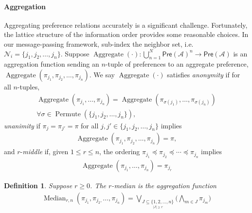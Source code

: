 \documentclass[conference]{ieeeconf}
\newcommand{\N}{\mathcal{N}}
\newcommand{\A}{\mathcal{A}}
\newcommand{\Pref}{\mathsf{Pre}}
\newcommand{\bigjoin}{\bigvee}
\newcommand{\bigmeet}{\bigwedge}
\renewcommand{\leq}{\leqslant}
\renewcommand{\geq}{\geqslant}
\DeclareMathOperator{\Aggregate}{Aggregate}
\DeclareMathOperator{\Median}{Median}
\DeclareMathOperator{\Permute}{Permute}
\newtheorem{definition}{Definition}
\begin{document}
\paragraph*{Aggregation}
Aggregating preference relations accurately is a significant challenge. Fortunately, the lattice structure of the information order provides some reasonable choices. In our message-passing framework, sub-index the neighbor set, i.e. $\N_i = \{j_1,j_2,\dots,j_n\}$. Suppose $\Aggregate(\cdot): \bigcup_{n =1}^{N} \Pref(\A)^n \to \Pref(\A)$ is an aggregation function sending an $n$-tuple of preferences to an aggregate preference, $\Aggregate(\pi_{j_1},\pi_{j_2}, \dots, \pi_{j_n})$. We say $\Aggregate(\cdot)$ satisfies \emph{anonymity} if for all $n$-tuples,
\begin{align*}
    \Aggregate\left( \pi_{j_1},\dots,\pi_{j_n}\right) = \Aggregate\left( \pi_{\sigma(j_1)},\dots,\pi_{\sigma(j_n)}\right) \\ \forall \sigma \in \Permute(\{j_1,j_2,\dots,j_n\}),
\end{align*}
 \emph{unanimity} if $\pi_{j} = \pi_{j'} = \pi$ for all $j, j' \in \{j_1,j_2,\dots,j_n\}$ implies 
\begin{align*}
    \Aggregate\left( \pi_{j_1},\pi_{j_2},\dots,\pi_{j_n}\right) = \pi, 
\end{align*}
and $r$-\emph{middle} if, given $1 \leq r \leq n$, the ordering $\pi_{j_1} \preceq \pi_{j_2} \preceq \cdots \preceq \pi_{j_n}$ implies
\begin{align*}
    \Aggregate\left( \pi_{j_1},\dots,\pi_{j_n}\right) = \pi_{j_r} 
\end{align*}


\begin{definition}
    Suppose $r \geq 0$. The $r$-\emph{median} is the aggregation function
\begin{align}
    \Median_{r,n}\left( \pi_{j_1},\pi_{j_2,}\dots,\pi_{j_n}\right) =
    \bigjoin_{\underset{|J| \geq r }{J \subseteq \{1,2,\dots,n\}}} \biggl( \bigmeet_{m \in J} \pi_{j_m} \biggr)
\end{align} \label{eq:median}
\end{definition}
\end{document}
